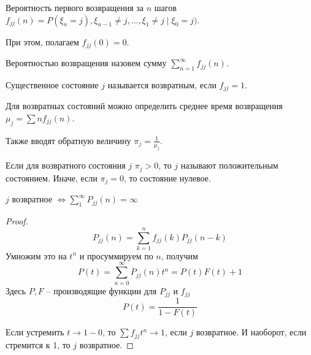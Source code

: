 \begin{Def}

Вероятность первого возвращения за $n$ шагов $f_{jj}(n) = P(\xi_n = j), \xi_{n-1} \neq j, \dots, \xi_1 \neq j \mid \xi_0 = j)$.

При этом, полагаем $f_{jj}(0) = 0$.

Вероятностью возвращения назовем сумму $\sum\limits_{n=1}^\infty f_{jj}(n)$.

\end{Def}

\begin{Def}
Существенное состояние $j$ называется возвратным, если $f_{jj} = 1$.
\end{Def}

\begin{Def}
Для возвратных состояний можно определить среднее время возвращения $\mu_j = \sum n f_{jj}(n)$. 

Также вводят обратную величину $\pi_j = \frac{1}{\mu_j}$. 

Если для возвратного состояния $j$ $\pi_j > 0$, то $j$ называют положительным состоянием. 
Иначе, если $\pi_j = 0$, то состояние нулевое.
\end{Def}

\begin{theorem}
$j$ возвратное $\Leftrightarrow \sum\limits_1^\infty P_{jj}(n) = \infty$
\end{theorem}
\begin{proof}
$$P_{jj}(n) = \sum\limits_{k=1}^n f_{jj}(k) P_{jj}(n - k)$$
Умножим это на $t^n$ и просуммируем по $n$, получим
$$P(t) = \sum\limits_{n=0}^\infty P_{jj}(n) t^n = P(t) F(t) + 1$$
Здесь $P, F$ -- производящие функции для $P_{jj}$ и $f_{jj}$
$$P(t) = \frac{1}{1 - F(t)}$$

Если устремить $t \to 1-0$, то $\sum f_{jj}t^n \to 1$, если $j$ возвратное.
И наоборот, если стремится к 1, то $j$ возвратное.
\end{proof}
